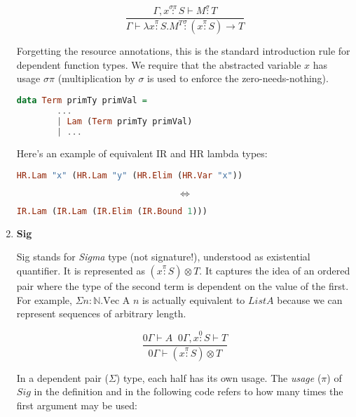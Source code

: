 \documentclass[acmsmall]{acmart}
\numberwithin{figure}{subsection}
\begin{document}
\begin{enumerate}
    \begin{equation*}
       \dfrac{\Gamma, x \stackrel{\sigma \pi}{:} S \vdash M \stackrel{\sigma}{:} T }{\Gamma \vdash \lambda x \stackrel{\pi}{:} S .M^T \stackrel{\sigma}{:} (x \stackrel{\pi}{:} S) \rightarrow T} 
    \end{equation*}

    Forgetting the resource annotations, this is the standard introduction rule for dependent function types. We require that the abstracted variable $x$ has usage $\sigma \pi$ (multiplication by $\sigma$ is used to enforce the zero-needs-nothing).

    \begin{lstlisting}[language=haskell]
data Term primTy primVal = 
        ...
        | Lam (Term primTy primVal)
        | ...
    \end{lstlisting}


    Here's an example of equivalent IR and HR lambda types:

    \begin{lstlisting}[language=haskell]
        HR.Lam "x" (HR.Lam "y" (HR.Elim (HR.Var "x"))
    \end{lstlisting}
    \begin{equation*}
      \Leftrightarrow  
    \end{equation*}
    \begin{lstlisting}[language=haskell]
        IR.Lam (IR.Lam (IR.Elim (IR.Bound 1)))
    \end{lstlisting}

    \item \textbf{Sig}

    Sig stands for \textit{Sigma} type (not signature!), understood as existential quantifier. It is represented as $(x \stackrel{\pi}{:} S) \otimes T$. It captures the idea of an ordered pair where the type of the second term is dependent on the value of the first. For example, $\Sigma n : \mathbb{N}. \text{Vec A } n$ is actually equivalent to $List A$ because we can represent sequences of arbitrary length.

    \begin{equation*}
        \dfrac{0\Gamma \vdash A \; \; 0\Gamma, x \stackrel{0}{:} S \vdash T}{0\Gamma \vdash (x \stackrel{\pi}{:} S) \otimes T}
    \end{equation*}

    In a dependent pair ($\Sigma$) type, each half has its own usage. The \textit{usage} ($\pi$) of $Sig$ in the definition and in the following code refers to how many times the first argument may be used:


\end{enumerate}
\end{document}
